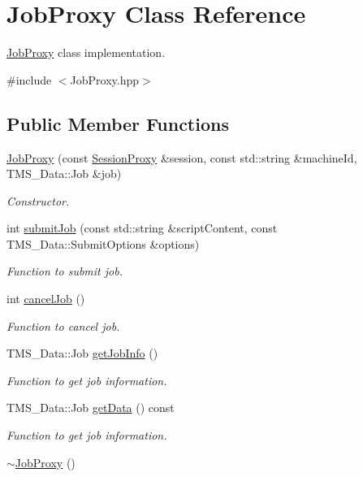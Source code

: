 \hypertarget{classJobProxy}{
\section{JobProxy Class Reference}
\label{classJobProxy}
}


\hyperlink{classJobProxy}{JobProxy} class implementation.  




{\ttfamily \#include $<$JobProxy.hpp$>$}

\subsection*{Public Member Functions}
\begin{DoxyCompactItemize}
\item 
\hyperlink{classJobProxy_ab3914c852a7be792043c2a6a28784032}{JobProxy} (const \hyperlink{classSessionProxy}{SessionProxy} \&session, const std::string \&machineId, TMS\_\-Data::Job \&job)
\begin{DoxyCompactList}\small\item\em Constructor. \item\end{DoxyCompactList}\item 
int \hyperlink{classJobProxy_a7b3249dd22a939ffbb31b9df9d6ec611}{submitJob} (const std::string \&scriptContent, const TMS\_\-Data::SubmitOptions \&options)
\begin{DoxyCompactList}\small\item\em Function to submit job. \item\end{DoxyCompactList}\item 
int \hyperlink{classJobProxy_a9ef6c41e1700255abb786d6c7e22e0b6}{cancelJob} ()
\begin{DoxyCompactList}\small\item\em Function to cancel job. \item\end{DoxyCompactList}\item 
TMS\_\-Data::Job \hyperlink{classJobProxy_a4723c335e407dfbe02032ae24d2ea576}{getJobInfo} ()
\begin{DoxyCompactList}\small\item\em Function to get job information. \item\end{DoxyCompactList}\item 
TMS\_\-Data::Job \hyperlink{classJobProxy_a98313fc7adb484805cec1d7a829819da}{getData} () const 
\begin{DoxyCompactList}\small\item\em Function to get job information. \item\end{DoxyCompactList}\item 
\hypertarget{classJobProxy_abf88dbfd0cdb94958a2781fab6e5d500}{
\hyperlink{classJobProxy_abf88dbfd0cdb94958a2781fab6e5d500}{$\sim$JobProxy} ()}
\label{classJobProxy_abf88dbfd0cdb94958a2781fab6e5d500}


\end{DoxyCompactItemize}
